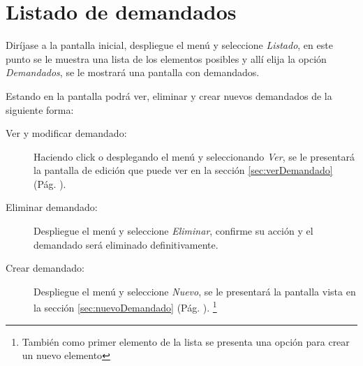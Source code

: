 \section{Listado de demandados}
\label{sec:listadoDemandados}
Dir\'ijase a la pantalla inicial, despliegue el men\'u \blackberry y seleccione
\emph{Listado}, en este punto se le muestra una lista de los elementos posibles
y all\'i elija la opci\'on \emph{Demandados}, se le mostrar\'a una
pantalla con demandados.

Estando en la pantalla podr\'a ver, eliminar y crear nuevos demandados de la
siguiente forma:

\begin{description}
\item[Ver y modificar demandado:]Haciendo click o desplegando el men\'u
\blackberry y seleccionando \emph{Ver}, se le presentar\'a la pantalla de
edici\'on que puede ver en la secci\'on \ref{sec:verDemandado} (P\'ag.
\pageref{sec:verDemandado}).
\item[Eliminar demandado:]Despliegue el men\'u \blackberry y seleccione
\emph{Eliminar}, confirme su acci\'on y el demandado ser\'a eliminado
definitivamente.
\item[Crear demandado:]Despliegue el men\'u \blackberry y seleccione
\emph{Nuevo}, se le presentar\'a la pantalla vista en la
secci\'on \ref{sec:nuevoDemandado}
(P\'ag. \pageref{sec:nuevoDemandado}).
\footnote{Tambi\'en como primer elemento de la lista se presenta una opci\'on
para crear un nuevo elemento}
\end{description}
